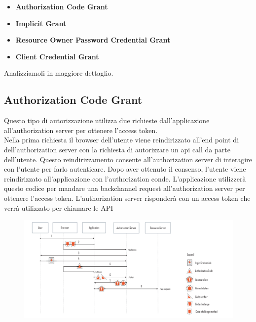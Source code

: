 \begin{itemize}
      \item \textbf{Authorization Code Grant}
      \item \textbf{Implicit Grant}
      \item \textbf{Resource Owner Password Credential Grant}
      \item \textbf{Client Credential Grant}
\end{itemize}

Analizziamoli in maggiore dettaglio.

\subsection{Authorization Code Grant}

Questo tipo di autorizzazione utilizza due richieste dall'applicazione all'authorization
server per ottenere l'access token.\\
Nella prima richiesta il browser dell'utente viene reindirizzato all'end point di
dell'authorization server con la richiesta di autorizzare un api call da parte
dell'utente.
Questo reindirizzamento consente all'authorization server di interagire con l'utente
per farlo autenticare. Dopo aver ottenuto il consenso, l'utente viene reindirizzato
all'applicazione
con l'authorization conde. L'applicazione utilizzerà questo codice per mandare una
backchannel request all'authorization server per ottenere l'access token.
L'authorization server risponderà con un access token che verrà utilizzato per
chiamare le API

\begin{figure}[H]
      \centering
      \includegraphics[width=\textwidth, keepaspectratio]{capitoli/id_managing/imgs/pkce.png}
\end{figure}

